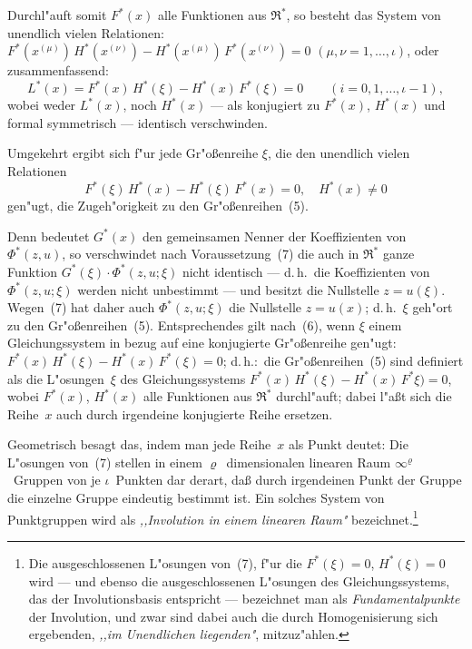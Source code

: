 \documentclass[11pt,a4paper]{article}
\begin{document}
Durchl"{a}uft somit $F^{*}(x)$ alle Funktionen aus $\mathfrak{R}^{*}$, so besteht das System
von unendlich vielen Relationen:
$F^{*}(x^{(\mu)})\,H^{*}(x^{(\nu)})-H^{*}(x^{(\mu)})\,F^{*}(x^{(\nu)})=0$
$(\mu,\nu=1,\dots,\iota)$,
oder zusammenfassend:
\begin{equation}
L^{*}(x)=F^{*}(x)\,H^{*}(\xi)-H^{*}(x)\,F^{*}(\xi)=0\qquad(i=0,1,\dots,\iota-1),
\tag{6}
\end{equation}
wobei weder $L^{*}(x)$, noch $H^{*}(x)$ --- als konjugiert zu $F^{*}(x)$, $H^{*}(x)$ und
formal symmetrisch --- identisch verschwinden.

Umgekehrt ergibt sich f"{u}r jede Gr"{o}\ss{}enreihe $\xi$, die den unendlich
vielen Relationen
\begin{equation}
F^{*}(\xi)\,H^{*}(x)-H^{*}(\xi)\,F^{*}(x)=0,\quad H^{*}(x)\neq 0
\tag{7}
\end{equation}
gen"{u}gt, die Zugeh"{o}rigkeit zu den Gr"{o}\ss{}enreihen~(5).

Denn bedeutet $G^{*}(x)$ den gemeinsamen Nenner der Koeffizienten von
$\Phi^{*}(z,u)$, so verschwindet nach Voraussetzung~(7) die auch in $\mathfrak{R}^{*}$ ganze Funktion
$G^{*}(\xi)\cdot\Phi^{*}(z,u;\xi)$
nicht identisch --- d.\,h.\ die Koeffizienten von $\Phi^{*}(z,u;\xi)$ werden nicht
unbestimmt --- und besitzt die Nullstelle $z=u(\xi)$.
Wegen~(7) hat daher auch $\Phi^{*}(z,u;\xi)$ die Nullstelle $z=u(x)$; d.\,h.~$\xi$
geh"{o}rt zu den Gr"{o}\ss{}enreihen~(5). Entsprechendes gilt nach~(6), wenn $\xi$
einem Gleichungssystem in bezug auf eine konjugierte Gr"{o}\ss{}enreihe gen"{u}gt:
$F^{*}(x)\,H^{*}(\xi)-H^{*}(x)\,F^{*}(\xi)=0$;
d.\,h.:\ die Gr"{o}\ss{}enreihen~(5) sind definiert als die L"{o}sungen~$\xi$ des Gleichungssystems
$F^{*}(x)\,H^{*}(\xi)-H^{*}(x)\,F^{*}\xi)=0$,
wobei $F^{*}(x)$, $H^{*}(x)$ alle Funktionen aus $\mathfrak{R}^{*}$ durchl"{a}uft; dabei l"{a}\ss{}t sich die
Reihe~$x$ auch durch irgendeine konjugierte Reihe ersetzen.

Geometrisch besagt das, indem man jede Reihe~$x$ als Punkt deutet:
Die L"{o}sungen von~(7) stellen in einem $\varrho$~dimensionalen linearen Raum
$\infty^{\varrho}$~Gruppen von je $\iota$~Punkten dar derart, da\ss{} durch irgendeinen Punkt
der Gruppe die einzelne Gruppe eindeutig bestimmt ist. Ein solches System
von Punktgruppen wird als \emph{,,Involution in einem linearen Raum"{}}
bezeichnet.\footnote{Die ausgeschlossenen L"{o}sungen von~(7), f"{u}r die
$F^{*}(\xi)=0$, $H^{*}(\xi)=0$ wird --- und ebenso die ausgeschlossenen L"{o}sungen
des Gleichungssystems, das der Involutionsbasis entspricht --- bezeichnet man als
\emph{Fundamentalpunkte} der Involution, und zwar sind dabei auch die durch
Homogenisierung sich ergebenden, \emph{,,im Unendlichen liegenden"{}}, mitzuz"{a}hlen.}
\end{document}
